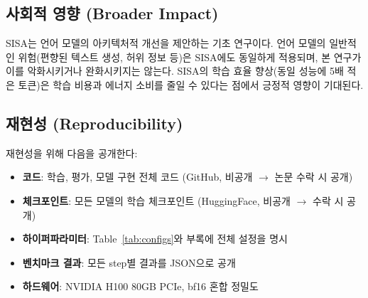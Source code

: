 \documentclass[11pt]{article}
\begin{document}
\subsection{사회적 영향 (Broader Impact)}

SISA는 언어 모델의 아키텍처적 개선을 제안하는 기초 연구이다. 언어 모델의 일반적인 위험(편향된 텍스트 생성, 허위 정보 등)은 SISA에도 동일하게 적용되며, 본 연구가 이를 악화시키거나 완화시키지는 않는다. SISA의 학습 효율 향상(동일 성능에 5배 적은 토큰)은 학습 비용과 에너지 소비를 줄일 수 있다는 점에서 긍정적 영향이 기대된다.

\subsection{재현성 (Reproducibility)}

재현성을 위해 다음을 공개한다:
\begin{itemize}[leftmargin=*]
\item \textbf{코드}: 학습, 평가, 모델 구현 전체 코드 (GitHub, 비공개 $\to$ 논문 수락 시 공개)
\item \textbf{체크포인트}: 모든 모델의 학습 체크포인트 (HuggingFace, 비공개 $\to$ 수락 시 공개)
\item \textbf{하이퍼파라미터}: Table~\ref{tab:configs}와 부록에 전체 설정을 명시
\item \textbf{벤치마크 결과}: 모든 step별 결과를 JSON으로 공개
\item \textbf{하드웨어}: NVIDIA H100 80GB PCIe, bf16 혼합 정밀도
\end{itemize}
\end{document}

